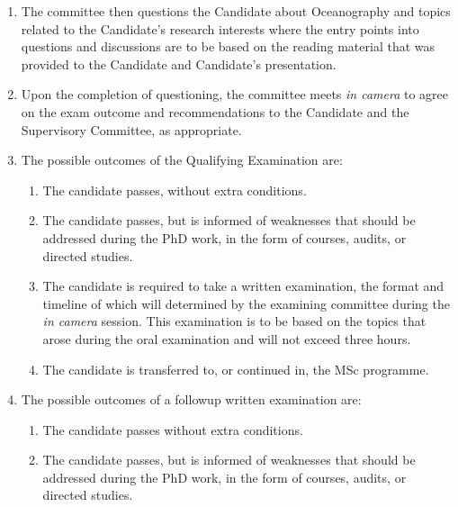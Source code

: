\documentclass[12pt]{article}
\newcommand{\supcom}{Supervisory Committee\xspace}
\begin{document}
\begin{enumerate}
    \item The committee then questions the Candidate about Oceanography and
        topics related to the Candidate's research interests where the entry
        points into questions and discussions are to be based on the reading
        material that was provided to the Candidate and Candidate's
        presentation.

    \item Upon the completion of questioning, the committee meets \emph{in
        camera} to agree on the exam outcome and recommendations to the
        Candidate and the \supcom, as appropriate.

    \item The possible outcomes of the Qualifying Examination are:

        \begin{enumerate}
            \item The candidate passes, without extra conditions.

            \item The candidate passes, but is informed of weaknesses that
                should be addressed during the PhD work, in the form of
                courses, audits, or directed studies.

            \item The candidate is required to take a written examination, the
                format and timeline of which will determined by the examining
                committee during the \emph{in camera} session. This examination
                is to be based on the topics that arose during the oral
                examination and will not exceed three hours. 

            \item The candidate is transferred to, or continued in, the MSc
                programme.

        \end{enumerate}

    \item The possible outcomes of a followup written examination are:

        \begin{enumerate}

            \item The candidate passes without extra conditions.

            \item The candidate passes, but is informed of weaknesses that
                should be addressed during the PhD work, in the form of
                courses, audits, or directed studies.


\end{enumerate}
\end{enumerate}
\end{document}
